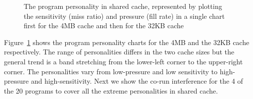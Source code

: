 \begin{figure}[t!]
\centering
  \hfill
\caption{The program personality in shared cache, represented by plotting
  the sensitivity (miss ratio) and pressure (fill rate) in a single
  chart first for the 4MB cache and then for the 32KB cache}
\label{fig:personality}
\end{figure}

Figure~\ref{fig:personality} shows the program personality charts for
the 4MB and the 32KB cache respectively.  The range of personalities
differs in the two cache sizes but the general trend is a band
stretching from the lower-left corner to the upper-right corner.  The
personalities vary from low-pressure and low sensitivity to
high-pressure and high-sensitivity.  Next we show the co-run
interference for the 4 of the 20 programs to cover all the extreme
personalities in shared cache.

